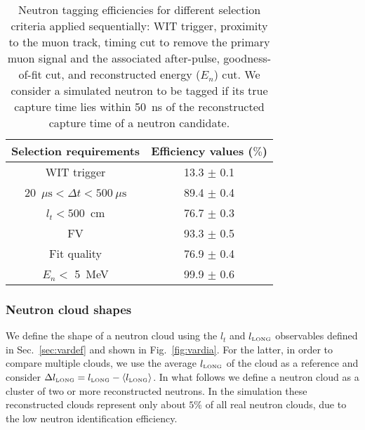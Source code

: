 \begin{table}
	\begin{center}
	\caption{\label{tab:tab_efficiency}Neutron tagging efficiencies for different selection criteria applied sequentially: WIT trigger, proximity to the muon track, timing cut to remove the primary muon signal and the associated after-pulse, goodness-of-fit cut, and reconstructed energy ($E_n$) cut. We consider a simulated neutron to be tagged if its true capture time lies within 50~ns of the reconstructed capture time of a neutron candidate.}
\begin{tabular}{cc}
	\toprule
	Selection requirements & Efficiency values ($\%$)      \\ 
	\hline
	WIT trigger & 13.3 $\pm$ 0.1 \\ 
	20~$\mu\mathrm{s}<  \Delta t < 500~\mu\mathrm{s}$ & 89.4 $\pm$ 0.4 \\ 
	$l_t<500$~cm & 76.7 $\pm$ 0.3 \\ 
	FV  & 93.3 $\pm$ 0.5 \\ 
	Fit quality & 76.9 $\pm$ 0.4 \\ 
	$E_n <$ 5~MeV & 99.9 $\pm$ 0.6 \\ 
	\bottomrule        %
\end{tabular}
\end{center}
\end{table} 
\subsubsection{Neutron cloud shapes}
We define the shape of a neutron cloud using the $l_t$ and $l_{\mbox{\tiny LONG}}$ observables defined in Sec.~\ref{sec:vardef} and shown in Fig.~\ref{fig:vardia}. For the latter, in order to compare multiple clouds, we use the average $l_{\mbox{\tiny LONG}}$ of the cloud as a reference and consider $\Delta l_{\mbox{\tiny LONG}} = l_{\mbox{\tiny LONG}} - \langle l_{\mbox{\tiny LONG}}\rangle$. In what follows we define a neutron cloud as a cluster of two or more reconstructed neutrons. In the simulation these reconstructed clouds represent only about $5\%$ of all real neutron clouds, due to the low neutron identification efficiency.

